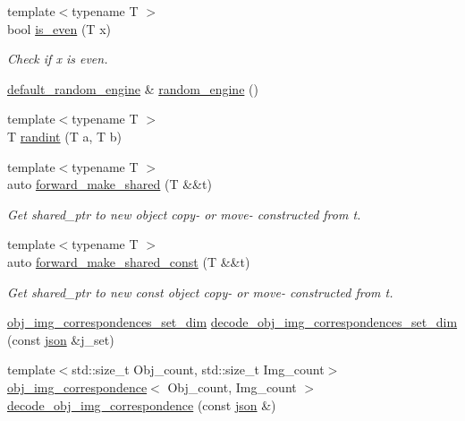 \begin{DoxyCompactItemize}
{\footnotesize template$<$typename T $>$ }\\bool \hyperlink{namespacetlz_aaf42ace4147284abeb14e1f6ac5714a1}{is\+\_\+even} (T x)
\begin{DoxyCompactList}\small\item\em Check if {\ttfamily x} is even. \end{DoxyCompactList}\item 
\hyperlink{namespacetlz_ac874ea3afd9982e4ba55013615f44871}{default\+\_\+random\+\_\+engine} \& \hyperlink{namespacetlz_ad5ec736865b759f4de6121e1e37b1f08}{random\+\_\+engine} ()
\item 
{\footnotesize template$<$typename T $>$ }\\T \hyperlink{namespacetlz_a157c283b272d104195c9b23633962106}{randint} (T a, T b)
\item 
{\footnotesize template$<$typename T $>$ }\\auto \hyperlink{namespacetlz_acca8d5c9592b305bbdceae72f9bc090f}{forward\+\_\+make\+\_\+shared} (T \&\&t)
\begin{DoxyCompactList}\small\item\em Get {\ttfamily shared\+\_\+ptr} to new object copy-\/ or move-\/ constructed from {\itshape t}. \end{DoxyCompactList}\item 
{\footnotesize template$<$typename T $>$ }\\auto \hyperlink{namespacetlz_afe89777e09419d71a5ef64410a48ed1f}{forward\+\_\+make\+\_\+shared\+\_\+const} (T \&\&t)
\begin{DoxyCompactList}\small\item\em Get {\ttfamily shared\+\_\+ptr} to new const object copy-\/ or move-\/ constructed from {\itshape t}. \end{DoxyCompactList}\item 
\hyperlink{structtlz_1_1obj__img__correspondences__set__dim}{obj\+\_\+img\+\_\+correspondences\+\_\+set\+\_\+dim} \hyperlink{namespacetlz_acac95b93493a5cbc6fb4717d68231a20}{decode\+\_\+obj\+\_\+img\+\_\+correspondences\+\_\+set\+\_\+dim} (const \hyperlink{namespacetlz_ac400657dfcddf6309a769aefc23eed0c}{json} \&j\+\_\+set)
\item 
{\footnotesize template$<$std\+::size\+\_\+t Obj\+\_\+count, std\+::size\+\_\+t Img\+\_\+count$>$ }\\\hyperlink{structtlz_1_1obj__img__correspondence}{obj\+\_\+img\+\_\+correspondence}$<$ Obj\+\_\+count, Img\+\_\+count $>$ \hyperlink{namespacetlz_aac861e973827974c2a38173ead0dcd70}{decode\+\_\+obj\+\_\+img\+\_\+correspondence} (const \hyperlink{namespacetlz_ac400657dfcddf6309a769aefc23eed0c}{json} \&)

\end{DoxyCompactItemize}
